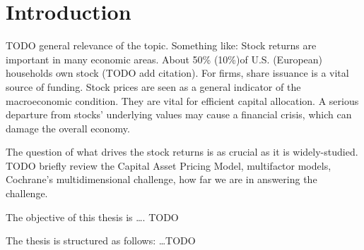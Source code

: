 \chapter{Introduction}
\label{chap:int}

TODO general relevance of the topic. Something like: Stock returns are important in many economic areas. About 50\% (10\%)of U.S. (European) households own stock (TODO add citation). For firms, share issuance is a vital source of funding. Stock prices are seen as a general indicator of the macroeconomic condition. They are vital for efficient capital allocation. A serious departure from stocks' underlying values may cause a financial crisis, which can damage the overall economy. 

The question of what drives the stock returns is as crucial as it is widely-studied. TODO briefly review the Capital Asset Pricing Model, multifactor models, Cochrane's multidimensional challenge, how far we are in answering the challenge.  

The objective of this thesis is \ldots. TODO

The thesis is structured as follows: \ldots TODO 
